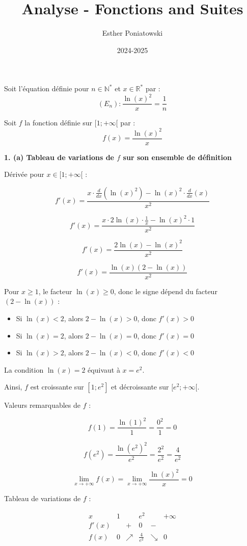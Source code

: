 \documentclass[10pt,a4paper]{article}
\title{Analyse - Fonctions and Suites}
\author{Esther Poniatowski}
\date{2024-2025}
\begin{document}
Soit l'équation définie pour \( n \in \mathbb{N}^* \) et \( x \in \mathbb{R}^* \) par :
\[
   (E_n) : \frac{\ln(x)^2}{x} = \frac{1}{n}
\]

Soit \( f \) la fonction définie sur \( [1; +\infty[ \) par :
\[
   f(x) = \frac{\ln(x)^2}{x}
\]

\bigskip
\textbf{1. (a) Tableau de variations de \( f \) sur son ensemble de définition}

Dérivée pour \( x \in [1; +\infty[ \) :

\[
f'(x) = \frac{x \cdot \frac{d}{dx}(\ln(x)^2) - \ln(x)^2 \cdot \frac{d}{dx}(x)}{x^2}
\]

\[
f'(x) = \frac{x \cdot 2\ln(x) \cdot \frac{1}{x} - \ln(x)^2 \cdot 1}{x^2}
\]

\[
f'(x) = \frac{2\ln(x) - \ln(x)^2}{x^2}
\]

\[
f'(x) = \frac{\ln(x)(2 - \ln(x))}{x^2}
\]

Pour \( x \geq 1 \), le facteur \( \ln(x) \geq 0 \), donc le signe dépend du facteur \( (2 - \ln(x))
\) :
\begin{itemize}
\item Si \( \ln(x) < 2 \), alors \( 2 - \ln(x) > 0 \), donc \( f'(x) > 0 \)
\item Si \( \ln(x) = 2 \), alors \( 2 - \ln(x) = 0 \), donc \( f'(x) = 0 \)
\item Si \( \ln(x) > 2 \), alors \( 2 - \ln(x) < 0 \), donc \( f'(x) < 0 \) \\
\end{itemize}

La condition \( \ln(x) = 2 \) équivaut à \( x = e^2 \).

Ainsi, \( f \) est croissante sur \( [1; e^2] \) et décroissante sur \( [e^2; +\infty[ \).

Valeurs remarquables de \( f \) :

\[
f(1) = \frac{\ln(1)^2}{1} = \frac{0^2}{1} = 0
\]

\[
f(e^2) = \frac{\ln(e^2)^2}{e^2} = \frac{2^2}{e^2} = \frac{4}{e^2}
\]

\[
\lim_{x \to +\infty} f(x) = \lim_{x \to +\infty} \frac{\ln(x)^2}{x} = 0
\]

Tableau de variations de \( f \) :

\[
\begin{array}{c|ccccc}
x & 1 &  & e^2 &  & +\infty \\
\hline
f'(x) &  & + & 0 & - &  \\
\hline
f(x) & 0 & \nearrow & \frac{4}{e^2} & \searrow & 0
\end{array}
\]
\end{document}

